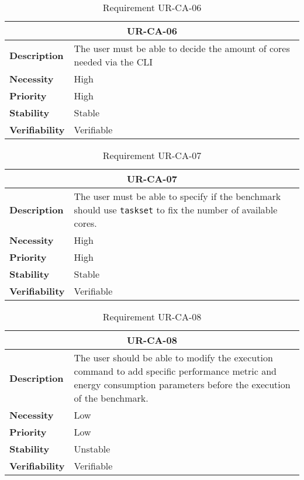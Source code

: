 \begin{table}[H]
    \centering
    \begin{tabular}{l p{10cm}}
        \toprule
        \multicolumn{2}{c}{UR-CA-06} \\
        \toprule
        \textbf{Description}        & The user must be able to decide the amount of cores needed via the CLI\\
        \textbf{Necessity}          & High   \\
        \textbf{Priority}           & High   \\
        \textbf{Stability}          & Stable \\
        \textbf{Verifiability}      & Verifiable \\
    \end{tabular}
    \caption{Requirement UR-CA-06}
    \label{tab:ur-ca-06}
\end{table}

\begin{table}[H]
    \centering
    \begin{tabular}{l p{10cm}}
        \toprule
        \multicolumn{2}{c}{UR-CA-07} \\
        \toprule
        \textbf{Description}        & The user must be able to specify if the benchmark should use \texttt{taskset} to fix the number of available cores.\\
        \textbf{Necessity}          & High   \\
        \textbf{Priority}           & High   \\
        \textbf{Stability}          & Stable \\
        \textbf{Verifiability}      & Verifiable \\
    \end{tabular}
    \caption{Requirement UR-CA-07}
    \label{tab:ur-ca-07}
\end{table}

\begin{table}[H]
    \centering
    \begin{tabular}{l p{10cm}}
        \toprule
        \multicolumn{2}{c}{UR-CA-08} \\
        \toprule
        \textbf{Description}        & The user should be able to modify the execution command to add specific performance metric and energy consumption parameters before the execution of the benchmark. \\
        \textbf{Necessity}          & Low   \\
        \textbf{Priority}           & Low   \\
        \textbf{Stability}          & Unstable \\
        \textbf{Verifiability}      & Verifiable \\
    \end{tabular}
    \caption{Requirement UR-CA-08}
    \label{tab:ur-ca-08}
\end{table}

